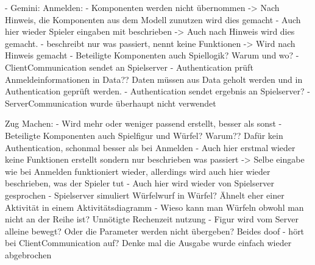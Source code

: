 - Gemini:
    Anmelden:
        - Komponenten werden nicht übernommen -> Nach Hinweis, die Komponenten aus dem Modell zunutzen wird dies gemacht
        - Auch hier wieder Spieler eingaben mit beschrieben -> Auch nach Hinweis wird dies gemacht.
        - beschreibt nur was passiert, nennt keine Funktionen -> Wird nach Hinweis gemacht
        - Beteiligte Komponenten auch Spiellogik? Warum und wo?
        - ClientCommunication sendet an Spielserver
        - Authentication prüft Anmeldeinformationen in Data?? Daten müssen aus Data geholt werden und in Authentication geprüft werden.
        - Authentication sendet ergebnis an Spielserver?
        - ServerCommunication wurde überhaupt nicht verwendet
    
    Zug Machen:
        - Wird mehr oder weniger passend erstellt, besser als sonst
        - Beteiligte Komponenten auch Spielfigur und Würfel? Warum?? Dafür kein Authentication, schonmal besser als bei Anmelden
        - Auch hier erstmal wieder keine Funktionen erstellt sondern nur beschrieben was passiert -> Selbe eingabe wie bei Anmelden funktioniert
        wieder, allerdings wird auch hier wieder beschrieben, was der Spieler tut
        - Auch hier wird wieder von Spielserver gesprochen
        - Spielserver simuliert Würfelwurf in Würfel? Ähnelt eher einer Aktivität in einem Aktivitätsdiagramm
        - Wieso kann man Würfeln obwohl man nicht an der Reihe ist? Unnötigte Rechenzeit nutzung
        - Figur wird vom Server alleine bewegt? Oder die Parameter werden nicht übergeben? Beides doof
        - hört bei ClientCommunication auf? Denke mal die Ausgabe wurde einfach wieder abgebrochen 



